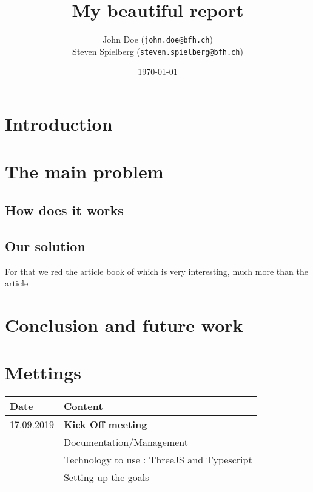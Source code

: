 \documentclass{scrartcl}
\begin{document}
\title{My beautiful report}
\date{\today}   %
\author{John Doe (\texttt{john.doe@bfh.ch}) \\
  Steven Spielberg (\texttt{steven.spielberg@bfh.ch})}
\maketitle
\tableofcontents
\clearpage

\section{Introduction}
\lipsum[1-5]

\section{The main problem}
\subsection{How does it works}

\lipsum[1-3]

\subsection{Our solution}
\lipsum[4-5]

For that we red the article book of \cite{Jerald:2015:VBH:2792790}
which is very interesting, much more than the article
\cite{Diniz:2017:UGO:3100317.3100324}

\section{Conclusion and future work}
\lipsum[6-7]

\section{Mettings}
\begin{tabular}{ | m{3cm} | m{10cm} | }
  \hline
  Date & Content \\
  \hline
  17.09.2019 & \textbf{Kick Off meeting}\\
  & Documentation/Management\\
  & Technology to use : ThreeJS and Typescript\\
  & Setting up the goals\\
  \hline
\end{tabular}



\printbibliography[heading=bibintoc]
\end{document}

